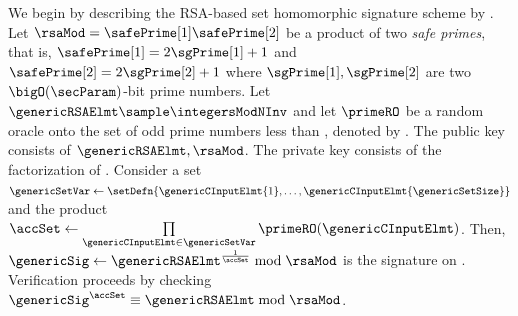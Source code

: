 \iffalse 
We begin by describing the RSA-based set 
homomorphic signature scheme by \citet{johnson2002homomorphic}. Let $\rsaMod = \safePrime[1] 
\safePrime[2]$ be a product of two 
\textit{safe primes}, that is, $\safePrime[1] = 2 \sgPrime[1] + 1$ and $\safePrime[2] = 2 
\sgPrime[2] + 1$ where $\sgPrime[1], \sgPrime[2]$ are two $\bigO(\secParam)$-bit prime numbers. 
Let $\genericRSAElmt \sample \integersModNInv$ and 
let $\primeRO$ be a random oracle onto the set of odd prime numbers less than \rsaMod, denoted by 
\primes. The public 
key consists of $\genericRSAElmt, \rsaMod$. The private key consists of the factorization of 
\rsaMod. Consider a set $\genericSetVar \gets \setDefn{\genericCInputElmt{1}, \dots, 
\genericCInputElmt{\genericSetSize}}$ and the product $\accSet \gets \prod\limits_{\genericCInputElmt 
\in \genericSetVar} \primeRO(\genericCInputElmt)$. Then, $\genericSig 
\gets \genericRSAElmt^{\frac{1}{\accSet}} \bmod \rsaMod$ is the signature on \genericSetVar . 
Verification 
proceeds by checking $\genericSig^{\accSet} \equiv \genericRSAElmt \bmod \rsaMod$. 

